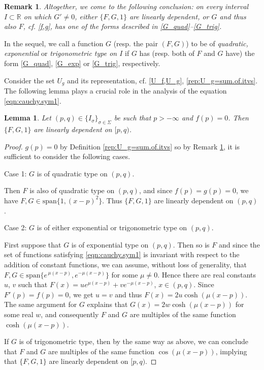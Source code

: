\documentclass{birkjour}
\newtheorem{lemma}[theorem]{Lemma}
\newtheorem{remark}[theorem]{Remark}
\begin{document}
\begin{remark}
\label{rem:cauchy.sym}
Altogether, we come to the following conclusion:
on every interval $I\subset{{\mathbb R}}$ on which $G'\neq 0$, either $\{F, G, 1\}$ are linearly dependent, or $G$ and thus also $F$, cf. \eqref{f,g}, has one of the forms described in \eqref{G_quad}--\eqref{G_trig}.
\end{remark}
In the sequel, we call a function $G$ (resp. the pair $(F,G)$) to be of \textit{quadratic, exponential} or \textit{trigonometric type on $I$} if $G$ has (resp. both of $F$ and $G$ have) the form \eqref{G_quad}, \eqref{G_exp} or \eqref{G_trig}, respectively.

Consider the set $U_g$ and its representation, cf. \eqref{U_f,U_g}, \eqref{rep:U_g=sum.of.itvs}. The following lemma plays a crucial role in the analysis of the equation \eqref{eqn:cauchy.sym1}.

\begin{lemma}
\label{lem:cauchy.sym.f(q)=0}
Let $(p,q)\in\{I_{\sigma}\}_{\sigma\in\Sigma}$ be such that $p>-\infty$ and $f(p)=0$. 
Then $\{F, G, 1\}$ are linearly dependent on $[p,q)$.
\end{lemma}
\begin{proof}
$g(p)=0$ by Definition \eqref{rep:U_g=sum.of.itvs} so by Remark \ref{rem:cauchy.sym}, it is sufficient to consider the following cases.

\smallskip
\noindent
Case 1: $G$ is of quadratic type on $(p,q)$.  

Then $F$ is also of quadratic type on $(p,q)$, and since $f(p)=g(p)=0$, we have $F,G\in\text{span}\bigl\{1, (x-p)^2\bigr\}$. Thus $\{F, G, 1\}$ are linearly dependent on $(p,q)$. 

\smallskip
\noindent
Case 2: $G$ is of either exponential or trigonometric type on $(p,q)$.

First suppose that $G$ is of exponential type on $(p,q)$. Then so is $F$ and since the set of functions satisfying \eqref{eqn:cauchy.sym1} is invariant with respect to the addition of constant functions, we can assume, without loss of generality, that $F,G \in \text{span} \bigl\{e^{\,\mu (x-p)}, e^{-\mu (x-p)}\bigr\}$ for some $\mu \neq 0$. Hence there are real constants $u$, $v$ such that $F(x) = ue^{\mu(x-p)} + ve^{-\mu(x-p)}$, $x\in (p,q)$. Since $F'(p)=f(p)=0$, we get $u=v$ and thus $F(x)=2u\cosh(\mu(x-p))$. The same argument for $G$ explains that $G(x)=2w\cosh(\mu(x-p))$ for some real $w$, and consequently $F$ and $G$ are multiples of the same function $\cosh(\mu(x-p))$.

If $G$ is of trigonometric type, then by the same way as above, we can conclude that $F$ and $G$ are multiples of the same function $\cos(\mu(x-p))$, implying that $\{F, G, 1\}$ are linearly dependent on $[p,q)$.
\end{proof}
\end{document}
